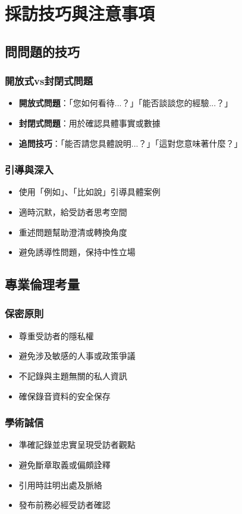 \documentclass[12pt,a4paper]{article}
\begin{document}
\section{採訪技巧與注意事項}

\subsection{問問題的技巧}
\subsubsection{開放式vs封閉式問題}
\begin{itemize}[nosep]
    \item \textbf{開放式問題}：「您如何看待...？」「能否談談您的經驗...？」
    \item \textbf{封閉式問題}：用於確認具體事實或數據
    \item \textbf{追問技巧}：「能否請您具體說明...？」「這對您意味著什麼？」
\end{itemize}

\subsubsection{引導與深入}
\begin{itemize}[nosep]
    \item 使用「例如」、「比如說」引導具體案例
    \item 適時沉默，給受訪者思考空間
    \item 重述問題幫助澄清或轉換角度
    \item 避免誘導性問題，保持中性立場
\end{itemize}

\subsection{專業倫理考量}
\subsubsection{保密原則}
\begin{itemize}[nosep]
    \item 尊重受訪者的隱私權
    \item 避免涉及敏感的人事或政策爭議
    \item 不記錄與主題無關的私人資訊
    \item 確保錄音資料的安全保存
\end{itemize}

\subsubsection{學術誠信}
\begin{itemize}[nosep]
    \item 準確記錄並忠實呈現受訪者觀點
    \item 避免斷章取義或偏頗詮釋
    \item 引用時註明出處及脈絡
    \item 發布前務必經受訪者確認
\end{itemize}
\end{document}
